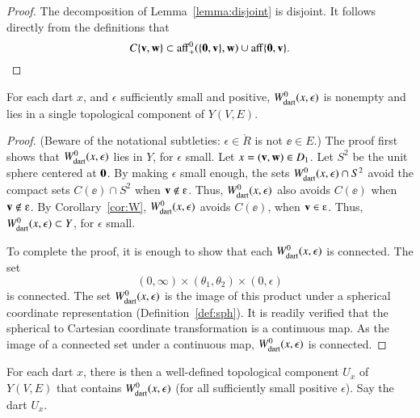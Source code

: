 \begin{proof} The decomposition of Lemma~\ref{lemma:disjoint} is
disjoint.  It follows directly from the definitions that
\begin{displaymath}C\{{\mathbf v},{\mathbf w}\}\subset {\operatorname{aff}}_+^0(\{{\mathbf 0},{\mathbf v}\},{\mathbf w}) \cup 
{\operatorname{aff}}\{{\mathbf 0},{\mathbf v}\}.\end{displaymath}
\end{proof}

\begin{lemma} 
For each dart $x$, and $\epsilon$ sufficiently small and positive,
$W^0_{\text{dart}}(x,\epsilon)$ is nonempty and lies in a single 
topological component of $Y(V,E)$.
\end{lemma}
%
%

\begin{proof} (Beware of the notational subtleties:
$\epsilon\in\ring{R}$ is not $\ee\in E$.)  The proof first shows
that $W^0_{\text{dart}}(x,\epsilon)$ lies in $Y$, for $\epsilon$ small.  Let
$x=({\mathbf v},{\mathbf w})\in D_1$.  Let $S^2$ be the unit sphere centered at
${\mathbf 0}$.  By making $\epsilon$ small enough, the sets
$W^0_{\text{dart}}(x,\epsilon)\cap S^2$ avoid the compact sets $C(\ee)\cap S^2$
when $\v\not\in \ee$.  Thus, $W^0_{\text{dart}}(x,\epsilon)$ also avoids
$C(\ee)$ when $\v\not\in \ee$.  By Corollary~\ref{cor:W},
$W^0_{\text{dart}}(x,\epsilon)$ avoids $C(\ee)$, when $\v\in \ee$.  Thus,
$W^0_{\text{dart}}(x,\epsilon)\subset Y$, for $\epsilon$ small.

To complete the proof, it is enough to show that each
$W^0_{\text{dart}}(x,\epsilon)$ is connected.  The set
\begin{displaymath}
(0,\infty) \times (\theta_1,\theta_2) \times (0,\epsilon)
\end{displaymath}
is connected.  The set $W^0_{\text{dart}}(x,\epsilon)$ is the image of this
product under a spherical coordinate representation
(Definition~\ref{def:sph}).  %
It is readily verified that the spherical to Cartesian coordinate
transformation is a continuous map. As the image of a connected set
under a continuous map, $W^0_{\text{dart}}(x,\epsilon)$ is connected.
\end{proof}
%
%

\begin{definition} For each dart $x$, 
there is then a well-defined topological
component $U_x$ of $Y(V,E)$ 
that contains $W^0_{\text{dart}}(x,\epsilon)$ (for all
sufficiently small positive $\epsilon$). Say the dart 
$U_x$.
\end{definition}
%


